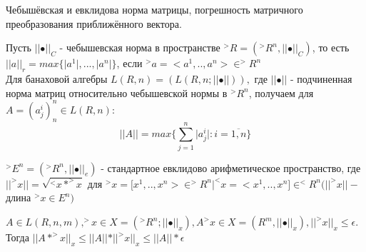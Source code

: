 \documentclass[__main__.tex]{subfiles}
\begin{document}
Чебышёвская и евклидова норма матрицы, погрешность матричного преобразования приближённого вектора.

\begin{definition}
	Пусть $\vert\vert \bullet \vert\vert_C$ - чебышевская норма в пространстве  $^>R=(^>R^n, \vert\vert \bullet \vert\vert_C)$, то есть $\vert\vert a\vert\vert_r=max\lbrace \vert a^1 \vert,...,\vert a^n \vert \rbrace$, если $^>a=<a^1,..,a^n>\in ^>R^n$\\
	Для банаховой алгебры $L(R,n)=(L(R,n;\vert\vert\bullet\vert\vert)),$ где $\vert\vert\bullet\vert\vert$ - подчиненная норма матриц относительно чебышевской нормы в $^>R^n$, получаем для $A=(a^{i}_j)^{n}_{n}\in L(R,n)$:
	$$\vert\vert A \vert\vert=max\lbrace\sum_{j=1}^{n}\vert a_{j}^{i}\vert:i=\overline{1,n}\rbrace$$
\end{definition}

\begin{definition}
	$^>E^n=(^>R^n,\vert\vert \bullet \vert\vert_e)$ - стандартное евклидово арифметическое пространство, где $\vert\vert ^>x \vert\vert=\sqrt{^<x*^>x}$ для $ ^>x=\lbrack x^1,..,x^n> \in ^>R^n \vert ^<x=<x^1,..,x^n \rbrack \in ^<R^n  (\vert\vert ^>x \vert\vert-$длина $^>x\in E^n )$
\end{definition}

\begin{definition}
	$A\in L(R,n,m), ^>x\in X = (^>R^n;\vert\vert\bullet\vert\vert_x), A ^>x \in X=(R^m,\vert\vert\bullet\vert\vert_x), \vert\vert ^>x\vert\vert_x \leq \epsilon$. Тогда $\vert\vert A* ^>x\vert\vert_x \leq \vert\vert A\vert\vert *\vert\vert ^>x\vert\vert_x \leq \vert\vert A \vert\vert * \epsilon$
\end{definition}
\end{document}
